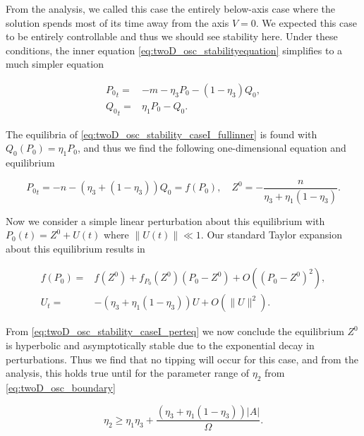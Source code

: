 From the analysis, we called this case the entirely below-axis case where the solution spends most of its time away from the axis $V=0$. We expected this case to be entirely controllable and thus we should see stability here. Under these conditions, the inner equation \eqref{eq:twoD_osc_stabilityequation} simplifies to a much simpler equation

\begin{equation}\label{eq:twoD_osc_stability_caseI_fullinner}
\begin{aligned}
{P_0}_t =& -m -\eta_3 P_0-(1-\eta_3)Q_0,\\
{Q_0}_t =& \eta_1 P_0 - Q_0.
\end{aligned}
\end{equation}

The equilibria of \eqref{eq:twoD_osc_stability_caseI_fullinner} is found with $Q_0(P_0)=\eta_1 P_0$, and thus we find the following one-dimensional equation and equilibrium

\begin{equation}\label{eq:twoD_osc_stability_caseI_red}
{P_0}_t = -n -(\eta_3 +(1-\eta_3))Q_0=f(P_0),\quad Z^0 = -\frac{n}{\eta_3+\eta_1(1-\eta_3)}.
\end{equation}

Now we consider a simple linear perturbation about this equilibrium with $P_0(t)= Z^0+U(t)$ where $\lVert U(t) \rVert \ll 1$. Our standard Taylor expansion about this equilibrium results in

\begin{equation}\label{eq:twoD_osc_stability_caseI_perteq}
\begin{aligned}
f(P_0)=&f(Z^0)+f_{P_0}(Z^0)(P_0-Z^0)+O((P_0-Z^0)^2),\\
U_t =& -(\eta_3+\eta_1(1-\eta_3))U + O(\lVert U\rVert ^2).
\end{aligned}
\end{equation}

From \eqref{eq:twoD_osc_stability_caseI_perteq} we now conclude the equilibrium $Z^0$ is hyperbolic and asymptotically stable due to the exponential decay in perturbations. Thus we find that no tipping will occur for this case, and from the analysis, this holds true until for the parameter range of $\eta_2$ from \eqref{eq:twoD_osc_boundary}

\begin{equation*}
\eta_2 \ge \eta_1\eta_3 +\frac{(\eta_3+\eta_1(1-\eta_3))|A|}{\Omega}.
\end{equation*}


